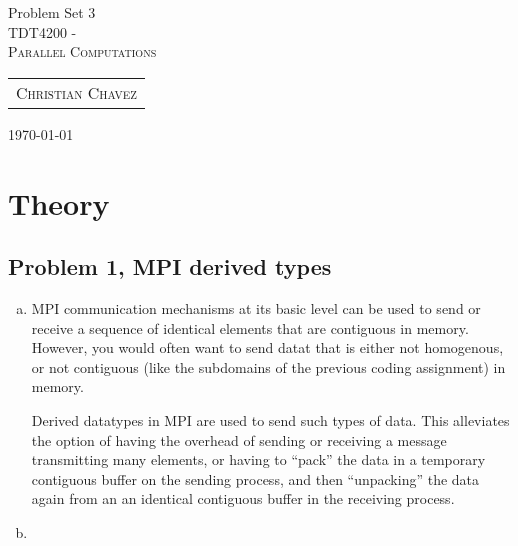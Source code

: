 \documentclass[fontsize=11pt, paper=a4, titlepage]{article}
\begin{document}
\begin{center}

{\huge Problem Set 3}\\[0.5cm]

\textsc{\LARGE TDT4200 -}\\[0.5cm]
\textsc{\large Parallel Computations}\\[1.0cm]

\begin{table}[h]
    \centering
    \begin{tabular}{c}
        \textsc{Christian Chavez}
    \end{tabular}
\end{table}

\end{center}
\vfill
\hfill \large{\today}
\clearpage

\section{Theory}
\subsection{Problem 1, MPI derived types}

\begin{enumerate}[a)]

    \item MPI communication mechanisms at its basic level can be used to send or
receive a sequence of identical elements that are contiguous in memory. However,
you would often want to send datat that is either not homogenous, or not
contiguous (like the subdomains of the previous coding assignment) in memory.

Derived datatypes in MPI are used to send such types of data. This alleviates
the option of having the overhead of sending or receiving a message transmitting
many elements, or having to ``pack'' the data in a temporary contiguous buffer
on the sending process, and then ``unpacking'' the data again from an an
identical contiguous buffer in the receiving process.

    \item

\end{enumerate}
\end{document}
